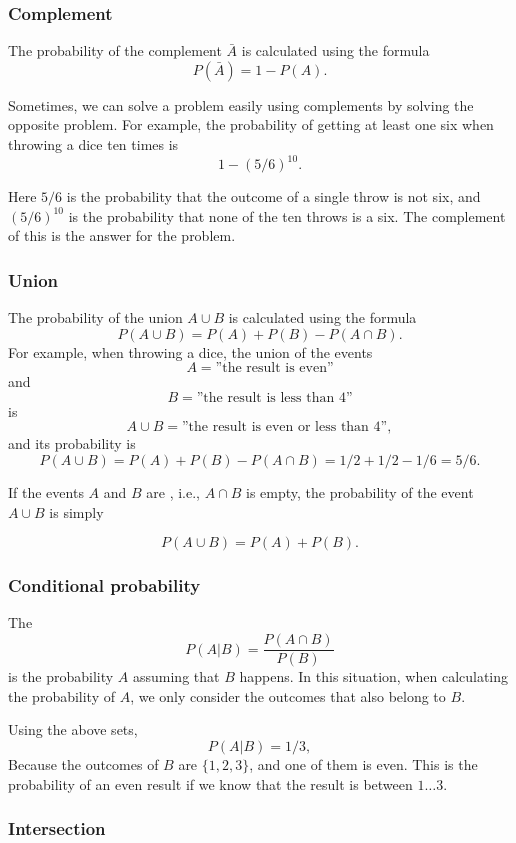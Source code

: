 \subsubsection{Complement}

The probability of the complement
$\bar A$ is calculated using the formula
\[P(\bar A)=1-P(A).\]

Sometimes, we can solve a problem easily
using complements by solving the opposite problem.
For example, the probability of getting
at least one six when throwing a dice ten times is
\[1-(5/6)^{10}.\]

Here $5/6$ is the probability that the outcome
of a single throw is not six, and
$(5/6)^{10}$ is the probability that none of
the ten throws is a six.
The complement of this is the answer for the problem.

\subsubsection{Union}

The probability of the union $A \cup B$
is calculated using the formula
\[P(A \cup B)=P(A)+P(B)-P(A \cap B).\]
For example, when throwing a dice,
the union of the events
\[A=\textrm{''the result is even''}\]
and
\[B=\textrm{''the result is less than 4''}\]
is
\[A \cup B=\textrm{''the result is even or less than 4''},\]
and its probability is
\[P(A \cup B) = P(A)+P(B)-P(A \cap B)=1/2+1/2-1/6=5/6.\]

If the events $A$ and $B$ are , i.e.,
$A \cap B$ is empty,
the probability of the event $A \cup B$ is simply

\[P(A \cup B)=P(A)+P(B).\]

\subsubsection{Conditional probability}


The 
\[P(A | B) = \frac{P(A \cap B)}{P(B)}\]
is the probability $A$
assuming that $B$ happens.
In this situation, when calculating the
probability of $A$, we only consider the outcomes
that also belong to $B$.

Using the above sets,
\[P(A | B)= 1/3,\]
Because the outcomes of $B$ are
$\{1,2,3\}$, and one of them is even.
This is the probability of an even result
if we know that the result is between $1 \ldots 3$.

\subsubsection{Intersection}

